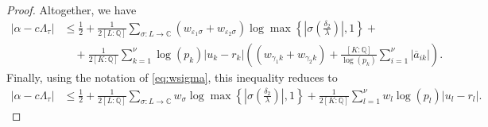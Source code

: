 \begin{proof}
Altogether, we have
\begin{align*}
|\alpha-c\Lambda_\tau| 
	& \leq \frac{1}{2} + \frac{1}{2[L:\mathbb{Q}]}\sum_{\sigma :L \to \mathbb{C}} (w_{\varepsilon_1 \sigma} + w_{\varepsilon_2 \sigma})\log \max \left\{ \left|\sigma\left(\frac{\delta_2}{\lambda}\right)\right|, 1\right\} + \\
	& \quad + \frac{1}{2[K:\mathbb{Q}]}\sum_{k = 1}^{\nu} \log(p_k)|u_k - r_k|\left( (w_{\gamma_1 k} + w_{\gamma_2 k}) + \frac{[K:\mathbb{Q}]}{\log(p_k)}\sum_{i=1}^{\nu}|\overline{a}_{ik}|\right).
\end{align*}
Finally, using the notation of \eqref{eq:wsigma}, this inequality reduces to
\begin{align*}
|\alpha-c\Lambda_\tau|
	& \leq \frac{1}{2} + \frac{1}{2[L:\mathbb{Q}]}\sum_{\sigma :L \to \mathbb{C}} w_{\sigma}\log \max \left\{ \left|\sigma\left(\frac{\delta_2}{\lambda}\right)\right|, 1\right\} + \frac{1}{2[K:\mathbb{Q}]}\sum_{l = 1}^{\nu}w_l \log(p_l)|u_l - r_l|.
\end{align*}


\end{proof}
